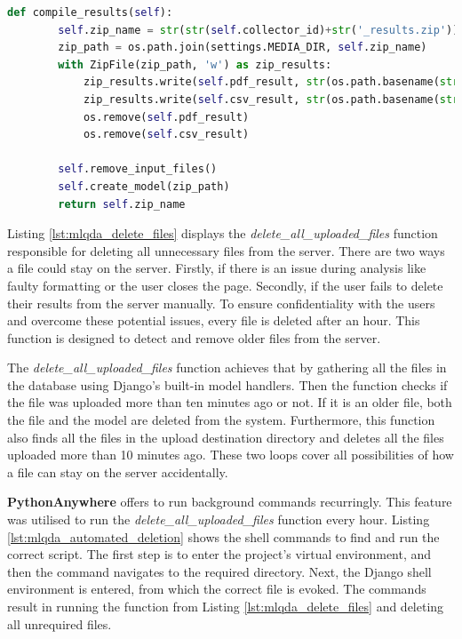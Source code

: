 \documentclass{l4proj}
\begin{document}
\begin{lstlisting}[language=python,
caption={Function to compile results for Sentiment Analysis.},
label=lst:mlqda_sa_result_compilation]
    def compile_results(self):
        self.zip_name = str(str(self.collector_id)+str('_results.zip'))
        zip_path = os.path.join(settings.MEDIA_DIR, self.zip_name)
        with ZipFile(zip_path, 'w') as zip_results:
            zip_results.write(self.pdf_result, str(os.path.basename(str(self.pdf_result))))
            zip_results.write(self.csv_result, str(os.path.basename(str(self.csv_result))))
            os.remove(self.pdf_result)
            os.remove(self.csv_result)

        self.remove_input_files()
        self.create_model(zip_path)
        return self.zip_name
\end{lstlisting}

Listing \ref{lst:mlqda_delete_files} displays the \textit{delete\_all\_uploaded\_files} function responsible for deleting all unnecessary files from the server. There are two ways a file could stay on the server. Firstly, if there is an issue during analysis like faulty formatting or the user closes the page. Secondly, if the user fails to delete their results from the server manually. To ensure confidentiality with the users and overcome these potential issues, every file is deleted after an hour. This function is designed to detect and remove older files from the server.

The \textit{delete\_all\_uploaded\_files} function achieves that by gathering all the files in the database using Django's built-in model handlers. Then the function checks if the file was uploaded more than ten minutes ago or not. If it is an older file, both the file and the model are deleted from the system. Furthermore, this function also finds all the files in the upload destination directory and deletes all the files uploaded more than 10 minutes ago. These two loops cover all possibilities of how a file can stay on the server accidentally.

\textbf{PythonAnywhere} offers to run background commands recurringly. This feature was utilised to run the \textit{delete\_all\_uploaded\_files} function every hour. Listing \ref{lst:mlqda_automated_deletion} shows the shell commands to find and run the correct script. The first step is to enter the project's virtual environment, and then the command navigates to the required directory. Next, the Django shell environment is entered, from which the correct file is evoked. The commands result in running the function from Listing \ref{lst:mlqda_delete_files} and deleting all unrequired files.
\end{document}
